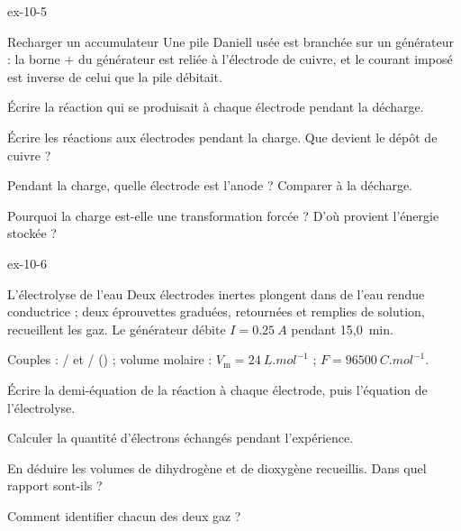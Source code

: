 \begin{blocLivre}{ex-10-5}
\begin{exercice}[1]{Recharger un accumulateur}
Une pile Daniell usée est branchée sur un générateur : la borne $+$ du générateur est reliée à l'électrode de cuivre,
et le courant imposé est inverse de celui que la pile débitait.
\begin{questions}
\item Écrire la réaction qui se produisait à chaque électrode pendant la décharge.
\item Écrire les réactions aux électrodes pendant la charge. Que devient le dépôt de cuivre ?
\item Pendant la charge, quelle électrode est l'anode ? Comparer à la décharge.
\item Pourquoi la charge est-elle une transformation forcée ? D'où provient l'énergie stockée ?
\end{questions}
\end{exercice}
\end{blocLivre}
\begin{blocLivre}{ex-10-6}
\begin{exercice}[2]{L'électrolyse de l'eau}
Deux électrodes inertes plongent dans de l'eau rendue conductrice ; deux éprouvettes graduées, retournées et remplies
de solution, recueillent les gaz. Le générateur débite $I=\qty{0,25}{A}$ pendant 15,0~min.
\begin{donnees}
Couples : / et / () ; volume molaire :
$V_\mathrm{m}=\qty{24}{L.mol^{-1}}$ ; $F=\qty{96500}{C.mol^{-1}}$.
\end{donnees}
\begin{questions}
\item Écrire la demi-équation de la réaction à chaque électrode, puis l'équation de l'électrolyse.
\item Calculer la quantité d'électrons échangés pendant l'expérience.
\item En déduire les volumes de dihydrogène et de dioxygène recueillis. Dans quel rapport sont-ils ?
\item Comment identifier chacun des deux gaz ?
\end{questions}
\end{exercice}
\end{blocLivre}
